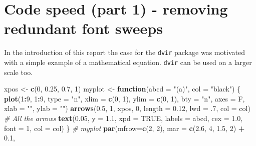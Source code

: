 \documentclass[]{article}
\newenvironment{Shaded}{\begin{snugshade}}{\end{snugshade}}
\newcommand{\KeywordTok}[1]{\textcolor[rgb]{0.13,0.29,0.53}{\textbf{#1}}}
\newcommand{\DataTypeTok}[1]{\textcolor[rgb]{0.13,0.29,0.53}{#1}}
\newcommand{\DecValTok}[1]{\textcolor[rgb]{0.00,0.00,0.81}{#1}}
\newcommand{\FloatTok}[1]{\textcolor[rgb]{0.00,0.00,0.81}{#1}}
\newcommand{\StringTok}[1]{\textcolor[rgb]{0.31,0.60,0.02}{#1}}
\newcommand{\CommentTok}[1]{\textcolor[rgb]{0.56,0.35,0.01}{\textit{#1}}}
\newcommand{\OtherTok}[1]{\textcolor[rgb]{0.56,0.35,0.01}{#1}}
\newcommand{\ControlFlowTok}[1]{\textcolor[rgb]{0.13,0.29,0.53}{\textbf{#1}}}
\newcommand{\OperatorTok}[1]{\textcolor[rgb]{0.81,0.36,0.00}{\textbf{#1}}}
\newcommand{\NormalTok}[1]{#1}
\begin{document}
\newpage{}

\section{Code speed (part 1) - removing redundant font
sweeps}\label{code-speed-part-1---removing-redundant-font-sweeps}

In the introduction of this report the case for the \texttt{dvir}
package was motivated with a simple example of a mathematical equation.
\texttt{dvir} can be used on a larger scale too.

\begin{Shaded}
\begin{Highlighting}[]
\NormalTok{xpos <-}\StringTok{ }\KeywordTok{c}\NormalTok{(}\DecValTok{0}\NormalTok{, }\FloatTok{0.25}\NormalTok{,  }\FloatTok{0.7}\NormalTok{, }\DecValTok{1}\NormalTok{)}
\NormalTok{myplot <-}\StringTok{ }\ControlFlowTok{function}\NormalTok{(}\DataTypeTok{abcd =} \StringTok{"(a)"}\NormalTok{, }\DataTypeTok{col =} \StringTok{"black"}\NormalTok{) \{}
  \KeywordTok{plot}\NormalTok{(}\DecValTok{1}\OperatorTok{:}\DecValTok{9}\NormalTok{, }\DecValTok{1}\OperatorTok{:}\DecValTok{9}\NormalTok{, }\DataTypeTok{type =} \StringTok{"n"}\NormalTok{, }\DataTypeTok{xlim =} \KeywordTok{c}\NormalTok{(}\DecValTok{0}\NormalTok{, }\DecValTok{1}\NormalTok{), }\DataTypeTok{ylim =} \KeywordTok{c}\NormalTok{(}\DecValTok{0}\NormalTok{, }\DecValTok{1}\NormalTok{), }
       \DataTypeTok{bty =} \StringTok{"n"}\NormalTok{, }\DataTypeTok{axes =}\NormalTok{ F, }\DataTypeTok{xlab =} \StringTok{""}\NormalTok{, }\DataTypeTok{ylab =} \StringTok{""}\NormalTok{)}
  \KeywordTok{arrows}\NormalTok{(}\FloatTok{0.5}\NormalTok{, }\DecValTok{1}\NormalTok{, xpos, }\DecValTok{0}\NormalTok{, }\DataTypeTok{length =} \FloatTok{0.12}\NormalTok{, }\DataTypeTok{lwd =} \FloatTok{.7}\NormalTok{,}
         \DataTypeTok{col =}\NormalTok{ col)  }\CommentTok{# All the arrows}
  \KeywordTok{text}\NormalTok{(}\FloatTok{0.05}\NormalTok{, }\DataTypeTok{y =} \FloatTok{1.1}\NormalTok{, }\DataTypeTok{xpd =} \OtherTok{TRUE}\NormalTok{, }\DataTypeTok{labels =}\NormalTok{ abcd, }\DataTypeTok{cex =} \FloatTok{1.0}\NormalTok{,}
       \DataTypeTok{font =} \DecValTok{1}\NormalTok{, }\DataTypeTok{col =}\NormalTok{ col)}
\NormalTok{\}  }\CommentTok{# myplot}
\KeywordTok{par}\NormalTok{(}\DataTypeTok{mfrow=}\KeywordTok{c}\NormalTok{(}\DecValTok{2}\NormalTok{, }\DecValTok{2}\NormalTok{),}
    \DataTypeTok{mar =} \KeywordTok{c}\NormalTok{(}\FloatTok{2.6}\NormalTok{, }\DecValTok{4}\NormalTok{, }\FloatTok{1.5}\NormalTok{, }\DecValTok{2}\NormalTok{) }\OperatorTok{+}\StringTok{ }\FloatTok{0.1}\NormalTok{,}

\end{Highlighting}
\end{Shaded}
\end{document}
